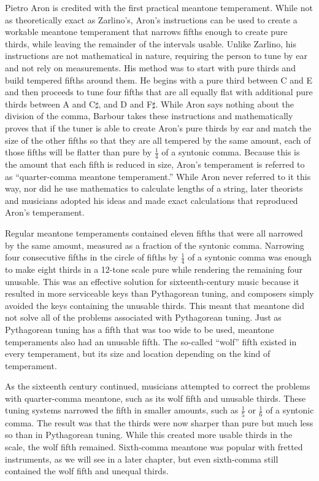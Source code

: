 Pietro Aron is credited with the first practical meantone temperament. While not as theoretically exact as Zarlino's,
Aron's instructions can be used to create a workable meantone temperament that narrows fifths enough to create pure
thirds, while leaving the remainder of the intervals usable. Unlike Zarlino, his instructions are not mathematical in
nature, requiring the person to tune by ear and not rely on measurements. His method was to start with pure thirds and
build tempered fifths around them. He begins with a pure third between C and E and then proceeds to tune four fifths
that are all equally flat with additional pure thirds between A and C$\sharp$, and D and F$\sharp$. While Aron says
nothing about the division of the comma, Barbour takes these instructions and mathematically proves that if the tuner is
able to create Aron's pure thirds by ear and match the size of the other fifths so that they are all tempered by the
same amount, each of those fifths will be flatter than pure by $ \frac{1}{4} $ of a syntonic comma.\autocite[27]{MB:1}
Because this is the amount that each fifth is reduced in size, Aron's temperament is referred to as ``quarter-comma
meantone temperament.'' While Aron never referred to it this way, nor did he use mathematics to calculate lengths of a
string, later theorists and musicians adopted his ideas and made exact calculations that reproduced Aron's temperament.

Regular meantone temperaments contained eleven fifths that were all narrowed by the same amount, measured as a fraction
of the syntonic comma. Narrowing four consecutive fifths in the circle of fifths by $ \frac{1}{4} $ of a syntonic comma
was enough to make eight thirds in a 12-tone scale pure while rendering the remaining four unusable.\autocite[33]{RD:1}
This was an effective solution for sixteenth-century music because it resulted in more serviceable keys than Pythagorean
tuning, and composers simply avoided the keys containing the unusable thirds. This meant that meantone did not solve all
of the problems associated with Pythagorean tuning. Just as Pythagorean tuning has a fifth that was too wide to be
used, meantone temperaments also had an unusable fifth. The so-called ``wolf'' fifth existed in every temperament, but
its size and location depending on the kind of temperament.

As the sixteenth century continued, musicians attempted to correct the problems with quarter-comma meantone, such as its
wolf fifth and unusable thirds. These tuning systems narrowed the fifth in smaller amounts, such as $ \frac{1}{5} $ or
$ \frac{1}{6} $ of a syntonic comma. The result was that the thirds were now sharper than pure but much less so than in
Pythagorean tuning. While this created more usable thirds in the scale, the wolf fifth remained. Sixth-comma meantone
was popular with fretted instruments, as we will see in a later chapter, but even sixth-comma still contained the wolf
fifth and unequal thirds.

